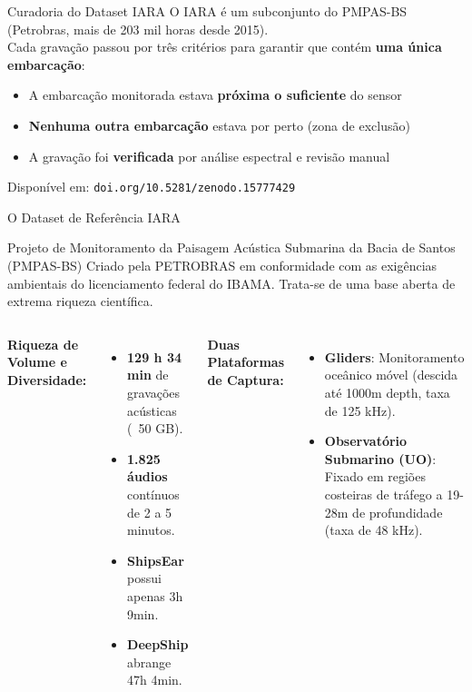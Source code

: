 \documentclass{beamer}
\begin{document}
\begin{frame}{Curadoria do Dataset IARA}
    \small
    O IARA é um subconjunto do PMPAS-BS (Petrobras, mais de 203 mil horas desde 2015).\\[0.4cm]
    Cada gravação passou por três critérios para garantir que contém \textbf{uma única embarcação}:

    \vspace{0.3cm}
    \begin{itemize}
        \setlength{\itemsep}{6pt}
        \item A embarcação monitorada estava \textbf{próxima o suficiente} do sensor
        \item \textbf{Nenhuma outra embarcação} estava por perto (zona de exclusão)
        \item A gravação foi \textbf{verificada} por análise espectral e revisão manual
    \end{itemize}

    \vspace{0.3cm}
    \footnotesize Disponível em: \texttt{doi.org/10.5281/zenodo.15777429}
\end{frame}

\begin{frame}{O Dataset de Referência IARA}
    \small
    \begin{block}{Projeto de Monitoramento da Paisagem Acústica Submarina da Bacia de Santos (PMPAS-BS)}
        Criado pela PETROBRAS em conformidade com as exigências ambientais do licenciamento federal do IBAMA. Trata-se de uma base aberta de extrema riqueza científica.
    \end{block}

    \begin{columns}
        \footnotesize
        \textbf{Riqueza de Volume e Diversidade:}
        \begin{itemize}
            \item \textbf{129 h 34 min} de gravações acústicas (~50 GB).
            \item \textbf{1.825 áudios} contínuos de 2 a 5 minutos.
            \item \textbf{ShipsEar} possui apenas 3h 9min.
            \item \textbf{DeepShip} abrange 47h 4min.
        \end{itemize}

        \footnotesize
        \textbf{Duas Plataformas de Captura:}
        \begin{itemize}
            \item \textbf{Gliders}: Monitoramento oceânico móvel (descida até 1000m depth, taxa de 125 kHz).
            \item \textbf{Observatório Submarino (UO)}: Fixado em regiões costeiras de tráfego a 19-28m de profundidade (taxa de 48 kHz).
        \end{itemize}
    \end{columns}
\end{frame}
\end{document}
